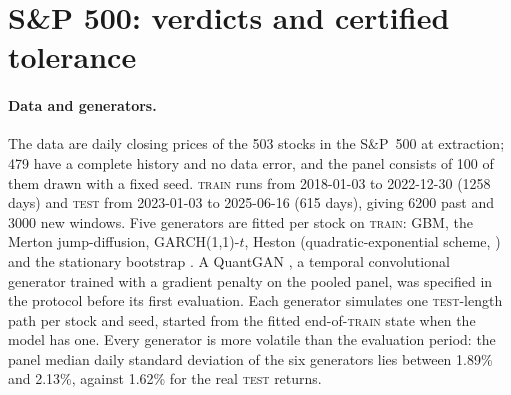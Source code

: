 \documentclass[11pt,a4paper]{article}
\theoremstyle{plain}
\newcommand{\TRAIN}{\textsc{train}}
\newcommand{\TEST}{\textsc{test}}
\newcommand{\GARCHt}{GARCH(1,1)-$t$}
\begin{document}
\section{S\&P 500: verdicts and certified tolerance}\label{sec:emp}

\paragraph{Data and generators.} The data are daily closing prices of the 503 stocks in the S\&P~500
at extraction; 479 have a complete history and no data error, and the panel consists of 100 of them
drawn with a fixed seed. \TRAIN{} runs from 2018-01-03 to 2022-12-30 (1258 days) and \TEST{} from
2023-01-03 to 2025-06-16 (615 days), giving 6200 past and 3000 new windows. Five generators are fitted
per stock on \TRAIN: GBM, the Merton jump-diffusion, \GARCHt{}, Heston (quadratic-exponential scheme,
\citealp{andersen_2008_simple}) and the stationary bootstrap \citep{politis1994stationary}. A
QuantGAN \citep{wiese2020quant}, a temporal convolutional generator trained with a gradient penalty
on the pooled panel, was specified in the protocol before its first evaluation. Each generator
simulates one \TEST-length path per stock and seed, started from the fitted end-of-\TRAIN{} state
when the model has one. Every generator is more volatile than the evaluation period: the panel median
daily standard deviation of the six generators lies between 1.89\% and 2.13\%, against 1.62\% for
the real \TEST{} returns.
\end{document}

